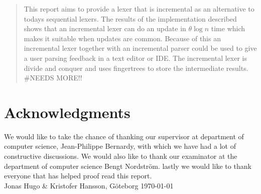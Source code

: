 \begin{abstract}
This report aims to provide a lexer that is incremental as an alternative to
todays sequential lexers. The results of the implementation described shows that
an incremental lexer can do an update in $\theta \log n$ time which makes it
suitable when updates are common. Because of this an incremental lexer together
with an incremental parser could be used to give a user parsing feedback in a
text editor or IDE. The incremental lexer is divide and conquer and uses
fingertrees to store the intermediate results. \#NEEDS MORE!!

\end{abstract}

\newpage
\thispagestyle{empty}
\clearpage
\mbox{}
\newpage
\clearpage
\thispagestyle{empty}
\section*{Acknowledgments}
We would like to take the chance of thanking our supervisor at department of
computer science, Jean-Philippe Bernardy, with which we have had a lot of
constructive discussions. We would also like to thank our examinator at the
department of computer science Bengt Nordström. lastly we would like to thank
everyone that has helped proof read this report.\\[1cm]

\hfill Jonas Hugo \& Kristofer Hansson, Göteborg \mydate\today
